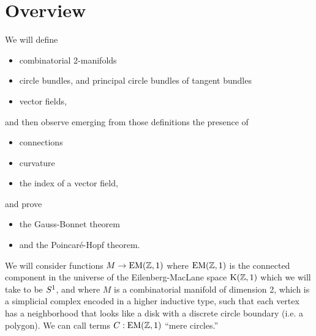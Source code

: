 \section{Overview}

We will define 
\begin{itemize}
\item combinatorial 2-manifolds
\item circle bundles, and principal circle bundles of tangent bundles
\item vector fields,
\end{itemize}
and then observe emerging from those definitions the presence of
\begin{itemize}
\item connections
\item curvature
\item the index of a vector field,
\end{itemize}
and prove
\begin{itemize}
\item the Gauss-Bonnet theorem
\item and the Poincaré-Hopf theorem.
\end{itemize}

We will consider functions \( M\to \mathrm{EM}(\mathbb{Z},1) \) where \( \mathrm{EM}(\mathbb{Z},1) \) is the connected component in the universe of the Eilenberg-MacLane space \( \mathrm{K}(\mathbb{Z},1) \) which we will take to be \( S^1 \), and where \( M \) is a combinatorial manifold of dimension 2, which is a simplicial complex encoded in a higher inductive type, such that each vertex has a neighborhood that looks like a disk with a discrete circle boundary (i.e. a polygon). We can call terms \( C:\mathrm{EM}(\mathbb{Z},1) \) ``mere circles.''

